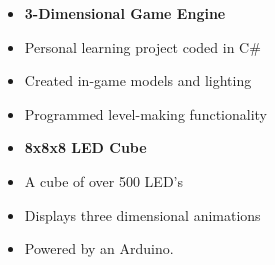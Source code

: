 \documentclass{article}
\begin{document}
\begin{minipage}[t]{0.5\textwidth}
  \vspace{0.5mm}
  \begin{itemize}[leftmargin=4mm]
    \item[] {\bf 3-Dimensional Game Engine } \\[-0.5mm]   
    \item[] Personal learning project coded in C\# \\[-2mm]   
    \item[] Created in-game models and lighting  \\[-2mm]   
    \item[] Programmed level-making functionality \\[2mm]
    \item[] {\bf 8x8x8 LED Cube } \\[-0.5mm]   
    \item[] A cube of over 500 LED's \\[-2mm]   
    \item[] Displays three dimensional animations \\[-2mm]   
    \item[] Powered by an Arduino. 
  \end{itemize}
\end{minipage}
\end{document}
